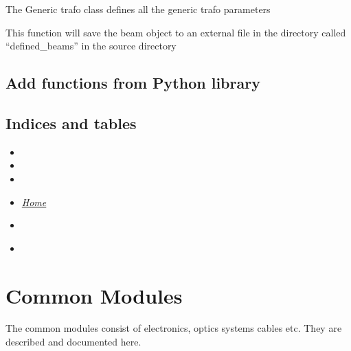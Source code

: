 \documentclass[letterpaper,10pt,english]{sphinxmanual}
\begin{document}
\begin{fulllineitems}
\label{device_modules:TrafoModule.generictrafo}
The Generic trafo class defines all the generic trafo parameters

\begin{fulllineitems}
\label{device_modules:TrafoModule.generictrafo.save}
This function will save the beam object to an external file in the directory called ``defined\_beams'' in the source directory

\end{fulllineitems}


\end{fulllineitems}



\subsection{Add functions from Python library}
\label{device_modules:add-functions-from-python-library}
\href{https://docs.python.org/library/io.html\#io.open}{}


\subsection{Indices and tables}
\label{device_modules:indices-and-tables}\begin{itemize}
\item {} 

\item {} 

\item {} 

\item {} 
{\hyperref[index::doc]{\emph{\emph{Home}}}}

\item {} 
{\hyperref[index:index-label]{\emph{}}}

\item {} 
{\hyperref[beam:beam-label]{\emph{}}}

\end{itemize}


\section{Common Modules}
\label{common_modules:common-modules}\label{common_modules::doc}
The common modules consist of electronics, optics systems cables etc. They are described and documented here.
\end{document}
